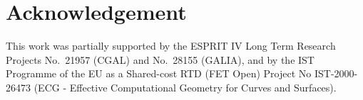 
\section{Acknowledgement}


This work was partially supported by the ESPRIT IV Long Term Research
Projects No.~21957 (CGAL) and No.~28155 (GALIA), and by the IST
Programme of the EU as a Shared-cost RTD (FET Open) Project No
IST-2000-26473 (ECG - Effective Computational Geometry for Curves and
Surfaces).

